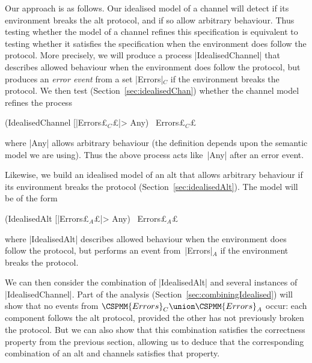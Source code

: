 Our approach is as follows.  Our idealised model of a channel will detect if
its environment breaks the alt protocol, and if so allow arbitrary behaviour.
Thus testing whether the model of a channel refines this specification is
equivalent to testing whether it satisfies the specification when the
environment does follow the protocol.  More precisely, we will produce a
process |IdealisedChannel| that describes allowed behaviour when the
environment does follow the protocol, but produces an \emph{error event} from
a set |Errors|$_C$ if the environment breaks the protocol.  We then test
(Section~\ref{sec:idealisedChan}) whether the channel model refines the
process
%
\begin{cspm}
(IdealisedChannel [|Errors£$_C$£|> Any) \ Errors£$_C$£
\end{cspm}
%
where |Any| allows arbitrary behaviour (the definition depends upon the
semantic model we are using).  Thus the above process acts like~|Any| after an
error event. 

Likewise, we build an idealised model of an alt that allows arbitrary
behaviour if its environment breaks the protocol
(Section~\ref{sec:idealisedAlt}).  The model will be of the form
%
\begin{cspm}
(IdealisedAlt [|Errors£$_A$£|> Any) \ Errors£$_A$£
\end{cspm}
%
where |IdealisedAlt| describes allowed behaviour when the environment does
follow the protocol, but performs an event from~|Errors|$_A$ if the
environment breaks the protocol.

We can then consider the combination of |IdealisedAlt| and several instances
of |IdealisedChannel|.  Part of the analysis
(Section~\ref{sec:combiningIdealised}) will show that no events from
$\CSPMM{Errors}_C \union \CSPMM{Errors}_A$ occur: each component follows the
alt protocol, provided the other has not previously broken the protocol.  But
we can also show that this combination satisfies the correctness property from
the previous section, allowing us to deduce that the corresponding combination
of an alt and channels satisfies that property.

